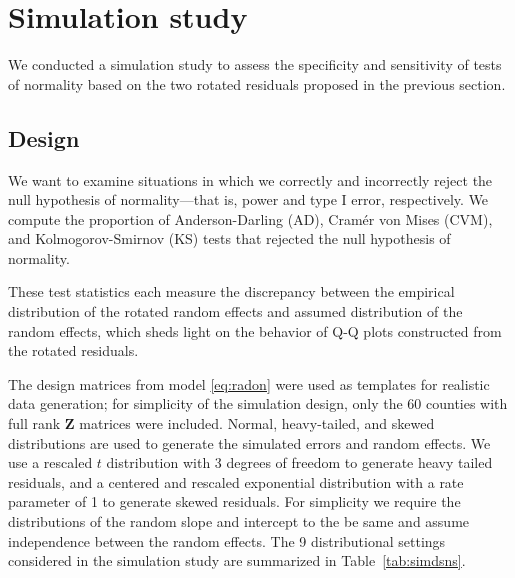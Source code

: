\documentclass[12pt]{article} %
\begin{document}
\section{Simulation study}\label{sec:simulation}

We conducted a simulation study to assess the specificity and sensitivity of tests of normality based on the two rotated residuals proposed in the previous section. 

\subsection{Design}\label{sec:sim-design}

We want to examine situations in which we correctly and incorrectly reject the null hypothesis of normality---that is, power and type I error, respectively. We compute the proportion of Anderson-Darling (AD), Cram{\'e}r von Mises (CVM), and Kolmogorov-Smirnov (KS) tests that rejected the null hypothesis of normality.

 These test statistics each measure the discrepancy between the empirical distribution of the rotated random effects and assumed distribution of the random effects, which sheds light on the behavior of Q-Q plots constructed from the rotated residuals. 


The design matrices from model \eqref{eq:radon} were used as templates for realistic data generation;  for simplicity of the simulation design, only the 60 counties with full rank $\bm{Z}$ matrices were included. 
Normal, heavy-tailed, and skewed distributions are used to generate the simulated errors and random effects. We use a rescaled $t$ distribution with 3 degrees of freedom to generate heavy tailed residuals, and a centered and rescaled exponential distribution with a rate parameter of 1 to generate skewed residuals. For simplicity we require the distributions of the random slope and intercept to the be same and assume independence between the random effects. The 9 distributional settings considered in the simulation study are summarized in Table~\ref{tab:simdsns}.
\end{document}
